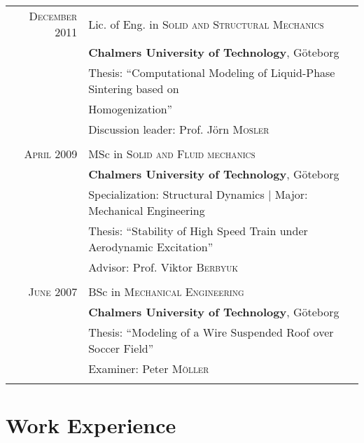 \documentclass[a4paper,10pt]{article} %
\begin{document}
{\begin{tabular}{rl}
\textsc{December} 2011 & Lic. of Eng. in \textsc{Solid and Structural Mechanics} \\
& \textbf{Chalmers University of Technology}, Göteborg\\
& Thesis: ``Computational Modeling of Liquid-Phase Sintering based on \\
& Homogenization''\\
& \small Discussion leader: Prof. Jörn \textsc{Mosler}\\
&\\


\textsc{April} 2009 & MSc in \textsc{Solid and Fluid mechanics}\\
& \textbf{Chalmers University of Technology}, Göteborg\\
& Specialization: Structural Dynamics | Major: Mechanical Engineering\\
& Thesis: ``Stability of High Speed Train under Aerodynamic Excitation''\\
& \small Advisor: Prof. Viktor \textsc{Berbyuk}\\
&\\


\textsc{June} 2007 & BSc in \textsc{Mechanical Engineering}\\
& \textbf{Chalmers University of Technology}, Göteborg\\
& Thesis: ``Modeling of a Wire Suspended Roof over Soccer Field''\\
& \small Examiner: Peter \textsc{Möller}\\
&\\

\end{tabular}


\section{Work Experience}

}
\end{document}
